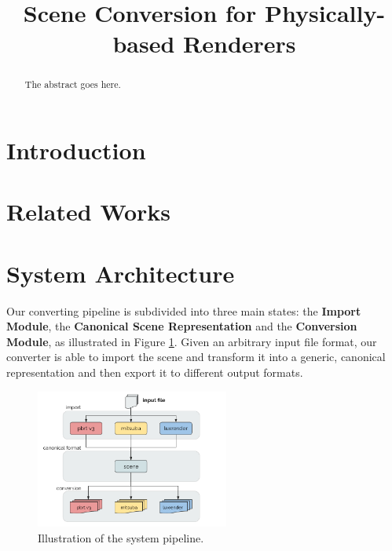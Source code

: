 \documentclass[10pt,conference]{IEEEtran}
\begin{document}
\title{Scene Conversion for Physically-based Renderers}

\newif\iffinal
\finaltrue
\newcommand{\jemsid}{99999}
\iffinal

\author{
\and
{}
}

\else
  \author{SIBGRAPI paper ID: \jemsid \\ }
\fi

\maketitle

\begin{abstract}
The abstract goes here.
\end{abstract}

\IEEEpeerreviewmaketitle

\section{Introduction}

\section{Related Works}

\section{System Architecture}
Our converting pipeline is subdivided into three main states: the \textbf{Import 
Module}, the \textbf{Canonical Scene Representation} and the \textbf{Conversion 
Module}, as illustrated in Figure \ref{fig:sysarch}. Given an arbitrary input 
file format, our converter is able to import the scene and transform it into a 
generic, canonical representation and then export it to different output 
formats. 

\begin{figure}[h]
\centering
\includegraphics[width=2.5in]{figs/3_system_architecture/architecture.png}
\caption{Illustration of the system pipeline.}
\label{fig:sysarch}
\end{figure}
\end{document}
